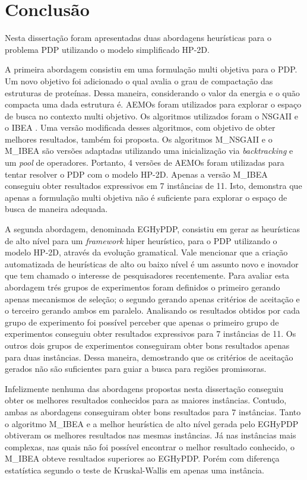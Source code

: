 \chapter{Conclusão}
\label{cap:conclusao}


Nesta dissertação foram apresentadas duas abordagens heurísticas para o problema PDP utilizando o modelo simplificado HP-2D. 

A primeira abordagem consistiu em uma formulação multi objetiva para o PDP. Um novo objetivo foi adicionado o qual avalia o grau de compactação das estruturas de proteínas. Dessa maneira, considerando o valor da energia e o quão compacta uma dada estrutura é. AEMOs foram utilizados para explorar o espaço de busca no contexto multi objetivo. Os algoritmos utilizados foram o NSGAII \cite{deb2002} e o IBEA \cite{zitzler2004indicator}. Uma versão modificada desses algoritmos, com objetivo de obter melhores resultados, também foi proposta. Os algoritmos M\_NSGAII e o M\_IBEA são versões adaptadas utilizando uma inicialização via \textit{backtracking}  e um \textit{pool} de operadores. Portanto, 4 versões de AEMOs foram utilizadas para tentar resolver o PDP com o modelo HP-2D. Apenas a versão M\_IBEA conseguiu obter resultados expressivos em 7 instâncias de 11. Isto, demonstra que apenas a formulação multi objetiva não é suficiente para explorar o espaço de busca de maneira adequada.  


A segunda abordagem, denominada EGHyPDP, consistiu em gerar as heurísticas de alto nível para um \textit{framework} hiper heurístico, para o PDP utilizando o modelo HP-2D, através da evolução gramatical. Vale mencionar que a criação automatizada de heurísticas de alto ou baixo nível é um assunto novo e inovador que tem chamado o interesse de pesquisadores recentemente. Para avaliar esta abordagem trés grupos de experimentos foram definidos o primeiro gerando apenas mecanismos de seleção; o segundo gerando apenas critérios de aceitação e o terceiro gerando ambos em paralelo. Analisando os resultados obtidos por cada grupo de experimento foi possível perceber que apenas o primeiro grupo de experimentos conseguiu obter resultados expressivos para 7 instâncias de 11. Os outros dois grupos de experimentos conseguiram obter bons resultados apenas para duas instâncias. Dessa maneira, demostrando que os critérios de aceitação gerados não são suficientes para guiar a busca para regiões promissoras. 

Infelizmente nenhuma das abordagens propostas nesta dissertação conseguiu obter os melhores resultados conhecidos para as maiores instâncias. Contudo, ambas as abordagens conseguiram obter bons resultados para 7 instâncias. Tanto o algoritmo M\_IBEA e a melhor heurística de alto nível gerada pelo EGHyPDP obtiveram os melhores resultados nas mesmas instâncias. Já nas instâncias mais complexas, nas quais não foi possível encontrar o melhor resultado conhecido, o M\_IBEA obteve resultados superiores ao EGHyPDP. Porém com diferença estatística segundo o teste de Kruskal-Wallis \cite{mckight2010kruskal} em apenas uma instância.

